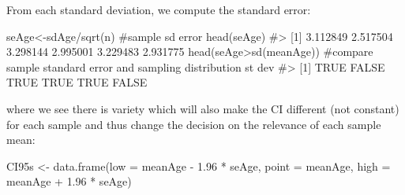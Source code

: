\documentclass[
  letterpaper,
  DIV=11,
  numbers=noendperiod]{scrreprt}
\newenvironment{Shaded}{\begin{snugshade}}{\end{snugshade}}
\newcommand{\AttributeTok}[1]{\textcolor[rgb]{0.40,0.45,0.13}{#1}}
\newcommand{\CommentTok}[1]{\textcolor[rgb]{0.37,0.37,0.37}{#1}}
\newcommand{\FloatTok}[1]{\textcolor[rgb]{0.68,0.00,0.00}{#1}}
\newcommand{\FunctionTok}[1]{\textcolor[rgb]{0.28,0.35,0.67}{#1}}
\newcommand{\NormalTok}[1]{\textcolor[rgb]{0.00,0.23,0.31}{#1}}
\newcommand{\OtherTok}[1]{\textcolor[rgb]{0.00,0.23,0.31}{#1}}
\newcommand{\SpecialCharTok}[1]{\textcolor[rgb]{0.37,0.37,0.37}{#1}}
\begin{document}
From each standard deviation, we compute the standard error:

\begin{Shaded}
\begin{Highlighting}[]
\NormalTok{seAge}\OtherTok{\textless{}{-}}\NormalTok{sdAge}\SpecialCharTok{/}\FunctionTok{sqrt}\NormalTok{(n) }\CommentTok{\#sample sd error }
\FunctionTok{head}\NormalTok{(seAge)}
\CommentTok{\#\textgreater{} [1] 3.112849 2.517504 3.298144 2.995001 3.229483 2.931775}
\FunctionTok{head}\NormalTok{(seAge}\SpecialCharTok{\textgreater{}}\FunctionTok{sd}\NormalTok{(meanAge)) }\CommentTok{\#compare sample standard error and sampling distribution st dev}
\CommentTok{\#\textgreater{} [1]  TRUE FALSE  TRUE  TRUE  TRUE FALSE}
\end{Highlighting}
\end{Shaded}

where we see there is variety which will also make the CI different (not
constant) for each sample and thus change the decision on the relevance
of each sample mean:

\begin{Shaded}
\begin{Highlighting}[]
\NormalTok{CI95s }\OtherTok{\textless{}{-}} \FunctionTok{data.frame}\NormalTok{(}\AttributeTok{low =}\NormalTok{ meanAge }\SpecialCharTok{{-}} \FloatTok{1.96} \SpecialCharTok{*}\NormalTok{ seAge, }
                   \AttributeTok{point =}\NormalTok{ meanAge,}
                   \AttributeTok{high =}\NormalTok{ meanAge }\SpecialCharTok{+} \FloatTok{1.96} \SpecialCharTok{*}\NormalTok{ seAge)}
\end{Highlighting}
\end{Shaded}

\begin{Shaded}
\end{Shaded}
\end{document}

